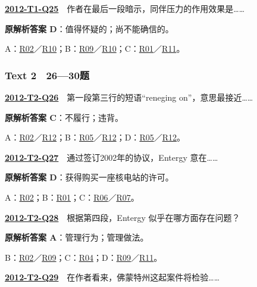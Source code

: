 \documentclass[11pt,a4paper]{article}
\begin{document}
\label{idx-2012-T1-Q25}\noindent\textbf{\href{https://zj139.github.io/math-notes/english/ff9729fa700fea3c5e7ecc04/\#q25}{2012-T1-Q25}}　作者在最后一段暗示，同伴压力的作用效果是……\par\nopagebreak
\noindent\textbf{原解析答案 D}：值得怀疑的；尚不能确信的。\par\nopagebreak
\noindent A：\hyperref[cat-R02]{R02}／\hyperref[cat-R10]{R10}；B：\hyperref[cat-R09]{R09}／\hyperref[cat-R10]{R10}；C：\hyperref[cat-R01]{R01}／\hyperref[cat-R11]{R11}。\par\smallskip
{}\subsubsection{Text 2　26—30题}
\label{idx-2012-T2-Q26}\noindent\textbf{\href{https://zj139.github.io/math-notes/english/a4585bde3b2a6d949145bd53/\#q26}{2012-T2-Q26}}　第一段第三行的短语“reneging on”，意思最接近……\par\nopagebreak
\noindent\textbf{原解析答案 C}：不履行；违背。\par\nopagebreak
\noindent A：\hyperref[cat-R02]{R02}／\hyperref[cat-R12]{R12}；B：\hyperref[cat-R05]{R05}／\hyperref[cat-R12]{R12}；D：\hyperref[cat-R05]{R05}／\hyperref[cat-R12]{R12}。\par\smallskip
{}\label{idx-2012-T2-Q27}\noindent\textbf{\href{https://zj139.github.io/math-notes/english/a4585bde3b2a6d949145bd53/\#q27}{2012-T2-Q27}}　通过签订2002年的协议，Entergy 意在……\par\nopagebreak
\noindent\textbf{原解析答案 D}：获得购买一座核电站的许可。\par\nopagebreak
\noindent A：\hyperref[cat-R02]{R02}；B：\hyperref[cat-R01]{R01}；C：\hyperref[cat-R06]{R06}／\hyperref[cat-R07]{R07}。\par\smallskip
{}\label{idx-2012-T2-Q28}\noindent\textbf{\href{https://zj139.github.io/math-notes/english/a4585bde3b2a6d949145bd53/\#q28}{2012-T2-Q28}}　根据第四段，Entergy 似乎在哪方面存在问题？\par\nopagebreak
\noindent\textbf{原解析答案 A}：管理行为；管理做法。\par\nopagebreak
\noindent B：\hyperref[cat-R02]{R02}／\hyperref[cat-R09]{R09}；C：\hyperref[cat-R04]{R04}；D：\hyperref[cat-R09]{R09}／\hyperref[cat-R11]{R11}。\par\smallskip
{}\label{idx-2012-T2-Q29}\noindent\textbf{\href{https://zj139.github.io/math-notes/english/a4585bde3b2a6d949145bd53/\#q29}{2012-T2-Q29}}　在作者看来，佛蒙特州这起案件将检验……\par\nopagebreak
\end{document}
